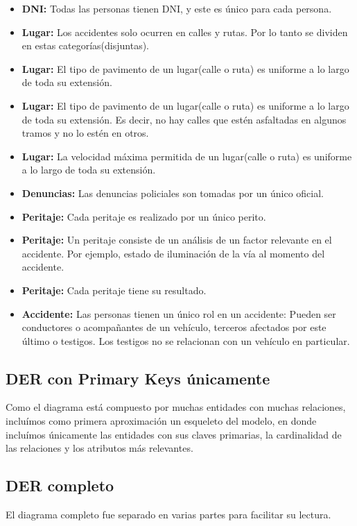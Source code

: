 \begin{itemize}
  \item \textbf{DNI:} Todas las personas tienen DNI, y este es único para cada persona.
  \item \textbf{Lugar:} Los accidentes solo ocurren en calles y rutas. Por lo tanto se dividen en estas categorías(disjuntas).
  \item \textbf{Lugar:}  El tipo de pavimento de un lugar(calle o ruta) es uniforme a lo largo de toda su extensión.
  \item \textbf{Lugar:}  El tipo de pavimento de un lugar(calle o ruta) es uniforme a lo largo de toda su extensión. Es decir, no hay calles que estén asfaltadas en algunos tramos y no lo estén en otros.
  \item \textbf{Lugar:}  La velocidad máxima permitida de un lugar(calle o ruta) es uniforme a lo largo de toda su extensión.
  \item \textbf{Denuncias:}  Las denuncias policiales son tomadas por un único oficial.
  \item \textbf{Peritaje:}  Cada peritaje es realizado por un único perito.
  \item \textbf{Peritaje:}   Un peritaje consiste de un análisis de un factor relevante en el accidente. Por ejemplo, estado de iluminación de la vía al momento del accidente.
  \item \textbf{Peritaje:}  Cada peritaje tiene su resultado.
  \item \textbf{Accidente:}  Las personas tienen un único rol en un accidente: Pueden ser conductores o acompañantes de un vehículo, terceros afectados por este último o testigos. Los testigos no se relacionan con un vehículo en particular.
\end{itemize}

\subsection{DER con Primary Keys únicamente}
Como el diagrama está compuesto por muchas entidades con muchas relaciones, incluímos como primera aproximación un esqueleto
del modelo, en donde incluímos únicamente las entidades con sus claves primarias, la cardinalidad de las relaciones y
los atributos más relevantes.

\subsection{DER completo}
El diagrama completo fue separado en varias partes para facilitar su lectura.

